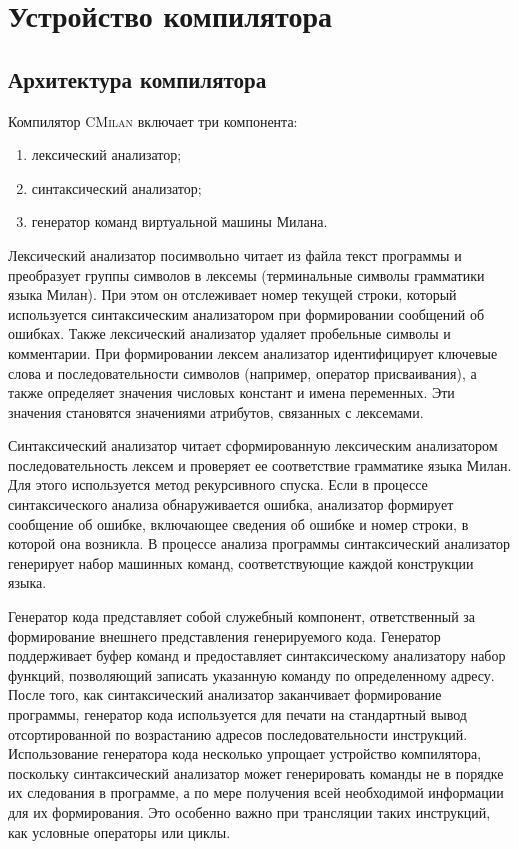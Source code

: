 \documentclass[a4paper,12pt]{article}
\begin{document}
\section{Устройство компилятора}

\subsection{Архитектура компилятора}
Компилятор \textsc{CMilan} включает три компонента:
\begin{enumerate}
\item лексический анализатор;
\item синтаксический анализатор;
\item генератор команд виртуальной машины Милана.
\end{enumerate}

Лексический анализатор посимвольно читает из файла текст программы и преобразует
группы символов в лексемы (терминальные символы грамматики языка Милан). При
этом он отслеживает номер текущей строки, который используется синтаксическим
анализатором при формировании сообщений об ошибках. Также лексический анализатор
удаляет пробельные символы и комментарии. При формировании лексем анализатор
идентифицирует ключевые слова и последовательности символов (например, оператор
присваивания), а также определяет значения числовых констант и имена переменных.
Эти значения становятся значениями атрибутов, связанных с лексемами.

Синтаксический анализатор читает сформированную лексическим анализатором
последовательность лексем и проверяет ее соответствие грамматике языка Милан.
Для этого используется метод рекурсивного спуска. Если в процессе
синтаксического анализа обнаруживается ошибка, анализатор формирует сообщение об
ошибке, включающее сведения об ошибке и номер строки, в которой она возникла.
В процессе анализа программы синтаксический анализатор генерирует набор машинных
команд, соответствующие каждой конструкции языка.

Генератор кода представляет собой служебный компонент, ответственный за
формирование внешнего представления генерируемого кода. Генератор поддерживает
буфер команд и предоставляет синтаксическому анализатору набор функций,
позволяющий записать указанную команду по определенному адресу. После того, как
синтаксический анализатор заканчивает формирование программы, генератор кода
используется для печати на стандартный вывод отсортированной по возрастанию
адресов последовательности инструкций. Использование генератора кода несколько
упрощает устройство компилятора, поскольку синтаксический анализатор может
генерировать команды не в порядке их следования в программе, а по мере получения
всей необходимой информации для их формирования. Это особенно важно при
трансляции таких инструкций, как условные операторы или циклы.
\end{document}
